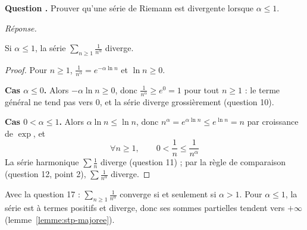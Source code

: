 \documentclass[11pt]{article}
\newcounter{qnum}
\newcommand{\question}[1]{%
\stepcounter{qnum}%
\bigskip
\noindent\textbf{Question \theqnum.} #1\par}
\newcommand{\reponse}{\noindent\textit{Réponse.}\ }
\begin{document}
\question{Prouver qu'une série de Riemann est divergente lorsque $\alpha\leq 1$.}
\reponse

\begin{prop}
\label{prop:riemann-dv}
Si $\alpha\leq 1$, la série $\sum_{n\geq1}\frac{1}{n^\alpha}$ diverge.
\end{prop}

\begin{proof}
Pour $n\geq 1$, $\frac{1}{n^\alpha}=e^{-\alpha\ln n}$ et $\ln n\geq 0$.

\textbf{Cas $\alpha\leq 0$.} Alors $-\alpha\ln n\geq 0$, donc $\frac{1}{n^\alpha}\geq e^0=1$ pour tout $n\geq 1$ : le terme général ne tend pas vers $0$, et la série diverge grossièrement (question 10).

\textbf{Cas $0<\alpha\leq 1$.} Alors $\alpha\ln n\leq\ln n$, donc $n^\alpha=e^{\alpha\ln n}\leq e^{\ln n}=n$ par croissance de $\exp$, et
\[\forall n\geq 1,\qquad 0<\frac1n\leq\frac{1}{n^\alpha}\]
La série harmonique $\sum\frac1n$ diverge (question 11) ; par la règle de comparaison (question 12, point 2), $\sum\frac{1}{n^\alpha}$ diverge.
\end{proof}

\begin{remarque}
Avec la question 17 : $\sum_{n\geq1}\frac{1}{n^\alpha}$ converge si et seulement si $\alpha>1$. Pour $\alpha\leq 1$, la série est à termes positifs et diverge, donc ses sommes partielles tendent vers $+\infty$ (lemme~\ref{lemme:stp-majoree}).
\end{remarque}
\end{document}
